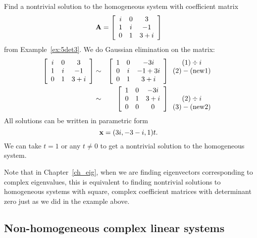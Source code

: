 \begin{example}
\label{ex:5homogeneous} 
Find a nontrivial solution to the homogeneous system with coefficient matrix 
\[
{\bf A} = \left[ \begin{array}{ccc} i & 0 & 3 \\ 1 & i & -1 \\ 0 & 1 & 3+i \end{array} \right]
\]
from Example~\ref{ex:5det3}. We do Gaussian elimination on the matrix: 
\begin{eqnarray*}
\left[ \begin{array}{ccc} i & 0 & 3 \\ 1 & i & -1 \\ 0 & 1 & 3+i  \end{array} \right]
& \sim & 
\left[ \begin{array}{ccc} 1& 0 & -3i \\ 0 & i & -1+3i  \\ 0 & 1 & 3+i  
\end{array} \right]
\begin{array}{c} (1) \div i \\ (2) -  ({\rm new}1) \\ \ \end{array} \\
& \sim & 
\left[ \begin{array}{ccc} 1& 0 & -3i \\ 0 & 1 & 3+i  \\ 0 & 0 & 0   
\end{array} \right]
\begin{array}{c}\  \\ (2) \div i \\ (3) -  ({\rm new}2) \end{array}
\end{eqnarray*}
All solutions can be written in parametric form 
\[
{\bf x} = (3i, -3-i, 1) t.
\]
We can take $t=1$ or any $t \neq 0$ to get a nontrivial solution to the homogeneous system. 
\end{example}

Note that in Chapter~\ref{ch_eig}, when we are finding eigenvectors corresponding to complex eigenvalues, this is equivalent to finding nontrivial solutions to homogeneous systems with square, complex coefficient matrices with determinant zero just as we did in the example above. 

\subsection{Non-homogeneous complex linear systems}

